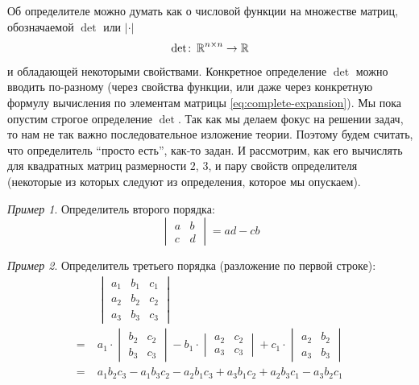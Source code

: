\documentclass[a4paper,12pt]{article}
\theoremstyle{definition}
\theoremstyle{remark}
\newtheorem*{example}{Пример}
\theoremstyle{remark}
\theoremstyle{remark}
\begin{document}
  Об определителе можно думать как о числовой функции на множестве матриц, обозначаемой $\det$ или $|\cdot|$
  \[
    \det \colon \operatorname{\mathbb R}^{n\times n} \to \operatorname{\mathbb R}
  \]
  и обладающей некоторыми свойствами.
  Конкретное определение $\det$ можно вводить по-разному (через свойства функции, или даже через конкретную формулу вычисления по элементам матрицы \ref{eq:complete-expansion}).
  Мы пока опустим строгое определение $\det$.
  Так как мы делаем фокус на решении задач, то нам не так важно последовательное изложение теории.
  Поэтому будем считать, что определитель ``просто есть'', как-то задан.
  И рассмотрим, как его вычислять для квадратных матриц размерности $2$, $3$, и пару свойств определителя (некоторые из которых следуют из определения, которое мы опускаем).
  
  \begin{example}
    Определитель второго порядка:
    \[
      \begin{vmatrix}
        a & b\\
        c & d
      \end{vmatrix} = ad - cb
    \]
  \end{example}

  \begin{example}
    Определитель третьего порядка (разложение по первой строке):
    \begin{equation*}
    \begin{split}
      &\begin{vmatrix}
        a_1 & b_1 & c_1\\
        a_2 & b_2 & c_2\\
        a_3 & b_3 & c_3
      \end{vmatrix}\\
        =\; &a_1 \cdot \begin{vmatrix}b_2 & c_2\\b_3 & c_3\end{vmatrix}
        - b_1 \cdot \begin{vmatrix}a_2 & c_2\\a_3 & c_3\end{vmatrix}
        + c_1 \cdot \begin{vmatrix}a_2 & b_2\\a_3 & b_3\end{vmatrix}\\
        =\; &a_1 b_2 c_3 - a_1 b_3 c_2 - a_2 b_1 c_3 + a_3 b_1 c_2 + a_2 b_3 c_1 - a_3 b_2 c_1
    \end{split}
    \end{equation*}
  \end{example}
  
\end{document}
